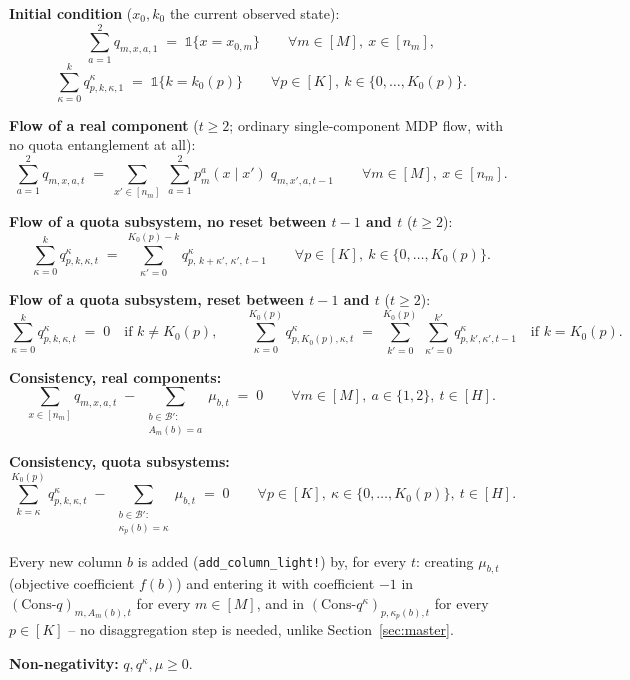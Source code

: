 \documentclass[11pt]{article}
\begin{document}
\textbf{Initial condition} ($x_0, k_0$ the current observed state):
\[
  \sum_{a=1}^{2} q_{m,x,a,1} \;=\; \mathbb 1\{x = x_{0,m}\}
  \qquad \forall m \in [M],\ x \in [n_m],
\]
\[
  \sum_{\kappa=0}^{k} q^{\kappa}_{p,k,\kappa,1} \;=\; \mathbb 1\{k = k_{0}(p)\}
  \qquad \forall p \in [K],\ k \in \{0,\dots,K_0(p)\}.
\]

\textbf{Flow of a real component} ($t \ge 2$; ordinary single-component MDP flow, with no
quota entanglement at all):
\[
  \sum_{a=1}^{2} q_{m,x,a,t}
  \;=\;
  \sum_{x' \in [n_m]}\ \sum_{a=1}^{2} p^a_m(x \mid x')\; q_{m,x',a,t-1}
  \qquad \forall m \in [M],\ x \in [n_m]. \tag{Flow-$q$}
\]

\textbf{Flow of a quota subsystem, no reset between $t{-}1$ and $t$} ($t \ge 2$):
\[
  \sum_{\kappa=0}^{k} q^{\kappa}_{p,k,\kappa,t}
  \;=\;
  \sum_{\kappa'=0}^{K_0(p)-k} q^{\kappa}_{p,\,k+\kappa',\,\kappa',\,t-1}
  \qquad \forall p \in [K],\ k \in \{0,\dots,K_0(p)\}. \tag{Flow-$q^\kappa$}
\]

\textbf{Flow of a quota subsystem, reset between $t{-}1$ and $t$} ($t \ge 2$):
\[
  \sum_{\kappa=0}^{k} q^{\kappa}_{p,k,\kappa,t} \;=\; 0 \quad \text{if } k \ne K_0(p),
  \qquad
  \sum_{\kappa=0}^{K_0(p)} q^{\kappa}_{p,K_0(p),\kappa,t}
  \;=\;
  \sum_{k'=0}^{K_0(p)}\ \sum_{\kappa'=0}^{k'} q^{\kappa}_{p,k',\kappa',t-1}
  \quad \text{if } k = K_0(p). \tag{Flow-$q^\kappa$-reset}
\]

\textbf{Consistency, real components:}
\[
  \sum_{x \in [n_m]} q_{m,x,a,t}
  \;-\;
  \sum_{\substack{b \in \mathcal B':\\ A_m(b)=a}} \mu_{b,t}
  \;=\; 0
  \qquad \forall m \in [M],\ a \in \{1,2\},\ t \in [H]. \tag{Cons-$q$}
\]

\textbf{Consistency, quota subsystems:}
\[
  \sum_{k=\kappa}^{K_0(p)} q^{\kappa}_{p,k,\kappa,t}
  \;-\;
  \sum_{\substack{b \in \mathcal B':\\ \kappa_p(b)=\kappa}} \mu_{b,t}
  \;=\; 0
  \qquad \forall p \in [K],\ \kappa \in \{0,\dots,K_0(p)\},\ t \in [H]. \tag{Cons-$q^\kappa$}
\]

Every new column $b$ is added (\texttt{add\_column\_light!}) by, for every $t$: creating
$\mu_{b,t}$ (objective coefficient $f(b)$) and entering it with coefficient $-1$ in
$(\mathrm{Cons}\text{-}q)_{m,A_m(b),t}$ for every $m \in [M]$, and in
$(\mathrm{Cons}\text{-}q^\kappa)_{p,\kappa_p(b),t}$ for every $p \in [K]$ -- no
disaggregation step is needed, unlike Section~\ref{sec:master}.

\textbf{Non-negativity:} $q, q^\kappa, \mu \ge 0$.
\end{document}
